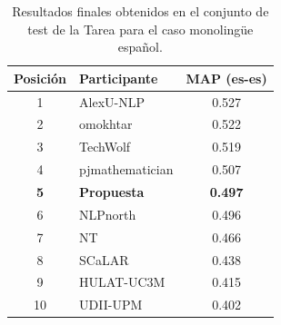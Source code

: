 \begin{table}[ht!]
    \centering
    \begin{tabular}{clc}
        \hline
        \textbf{Posición} & \textbf{Participante} & \textbf{MAP (es-es)} \\ \hline
        1                 & AlexU-NLP             & 0.527                \\ 
        2                 & omokhtar              & 0.522                \\ 
        3                 & TechWolf              & 0.519                \\ 
        4                 & pjmathematician       & 0.507                \\ 
        \textbf{5}        & \textbf{Propuesta}    & \textbf{0.497}       \\ 
        6                 & NLPnorth              & 0.496                \\ 
        7                 & NT                    & 0.466                \\
        8                 & SCaLAR                & 0.438                \\
        9                 & HULAT-UC3M            & 0.415                \\ 
        10                & UDII-UPM              & 0.402                \\ \hline
        
        
    \end{tabular}
    \caption{Resultados finales obtenidos en el conjunto de test de la \gls{Tarea} para el caso monolingüe español.}
    \label{tab:final_results_test_es}
\end{table}

